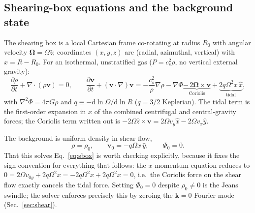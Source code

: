 \documentclass[11pt]{article}
\begin{document}
\subsection{Shearing-box equations and the background state}
The shearing box is a local Cartesian frame co-rotating at radius $R_0$ with angular
velocity $\mathbf{\Omega}=\Omega\hat z$; coordinates $(x,y,z)$ are (radial, azimuthal,
vertical) with $x = R-R_0$. For an isothermal, unstratified gas ($P=c_s^2\rho$, no
vertical external gravity):
\begin{equation}
  \frac{\partial\rho}{\partial t} + \nabla\cdot(\rho\mathbf{v}) = 0,
  \qquad
  \frac{\partial\mathbf{v}}{\partial t} + (\mathbf{v}\cdot\nabla)\mathbf{v}
  = -\frac{c_s^2}{\rho}\nabla\rho - \nabla\Phi
    \underbrace{-\,2\mathbf{\Omega}\times\mathbf{v}}_{\text{Coriolis}}
    + \underbrace{2q\Omega^2 x\,\hat x}_{\text{tidal}},
  \label{eq:sbox}
\end{equation}
with $\nabla^2\Phi = 4\pi G\rho$ and $q\equiv-\mathrm{d}\ln\Omega/\mathrm{d}\ln R$
($q=3/2$ Keplerian). The tidal term is the first-order expansion in $x$ of the
combined centrifugal and central-gravity forces; the Coriolis term written out is
$-2\Omega\hat z\times\mathbf{v} = 2\Omega v_y\hat x - 2\Omega v_x\hat y$.

The background is uniform density in shear flow,
\begin{equation}
  \rho = \rho_0, \qquad \mathbf{v}_0 = -q\Omega x\,\hat y, \qquad \Phi_0 = 0 .
\end{equation}
That this solves Eq.~\eqref{eq:sbox} is worth checking explicitly, because it fixes the
sign convention for everything that follows: the $x$-momentum equation reduces to
$0 = 2\Omega v_{0y} + 2q\Omega^2x = -2q\Omega^2x + 2q\Omega^2x = 0$, i.e.\ the Coriolis
force on the shear flow exactly cancels the tidal force. Setting $\Phi_0=0$ despite
$\rho_0\neq0$ is the Jeans swindle; the solver enforces precisely this by zeroing the
$\mathbf{k}=0$ Fourier mode (Sec.~\ref{sec:shear}).
\end{document}
